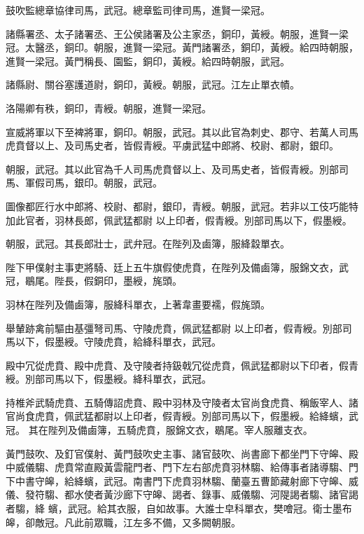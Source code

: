 \begin{pinyinscope}
 鼓吹監總章協律司馬，武冠。總章監司律司馬，進賢一梁冠。



 諸縣署丞、太子諸署丞、王公侯諸署及公主家丞，銅印，黃綬。朝服，進賢一梁冠。太醫丞，銅印。朝服，進賢一梁冠。黃門諸署丞，銅印，黃綬。給四時朝服，進賢一梁冠。黃門稱長、園監，銅印，黃綬。給四時朝服，武冠。



 諸縣尉、關谷塞護道尉，銅印，黃綬。朝服，武冠。江左止單衣幘。



 洛陽卿有秩，銅印，青綬。朝服，進賢一梁冠。



 宣威將軍以下至裨將軍，銅印。朝服，武冠。其以此官為刺史、郡守、若萬人司馬虎賁督以上、及司馬史者，皆假青綬。平虜武猛中郎將、校尉、都尉，銀印。



 朝服，武冠。其以此官為千人司馬虎賁督以上、及司馬史者，皆假青綬。別部司馬、軍假司馬，銀印。朝服，武冠。



 圖像都匠行水中郎將、校尉、都尉，銀印，青綬。朝服，武冠。若非以工伎巧能特加此官者，羽林長郎，佩武猛都尉
 以上印者，假青綬。別部司馬以下，假墨綬。



 朝服，武冠。其長郎壯士，武弁冠。在陛列及鹵簿，服絳縠單衣。



 陛下甲僕射主事吏將騎、廷上五牛旗假使虎賁，在陛列及備鹵簿，服錦文衣，武冠，鶡尾。陛長，假銅印，墨綬，旄頭。



 羽林在陛列及備鹵簿，服絳科單衣，上著韋畫要襦，假旄頭。



 舉輦跡禽前驅由基彊弩司馬、守陵虎賁，佩武猛都尉
 以上印者，假青綬。別部司馬以下，假墨綬。守陵虎賁，給絳科單衣，武冠。



 殿中冗從虎賁、殿中虎賁、及守陵者持鈒戟冗從虎賁，佩武猛都尉以下印者，假青綬。別部司馬以下，假墨綬。絳科單衣，武冠。



 持椎斧武騎虎賁、五騎傳詔虎賁、殿中羽林及守陵者太官尚食虎賁、稱飯宰人、諸官尚食虎賁，佩武猛都尉以上印者，假青綬。別部司馬以下，假墨綬。給絳蠙，武冠。
 其在陛列及備鹵簿，五騎虎賁，服錦文衣，鶡尾。宰人服離支衣。



 黃門鼓吹、及釘官僕射、黃門鼓吹史主事、諸官鼓吹、尚書廊下都坐門下守皞、殿中威儀騶、虎賁常直殿黃雲龍門者、門下左右部虎賁羽林騶、給傳事者諸導騶、門下中書守皞，給絳蠙，武冠。南書門下虎賁羽林騶、蘭臺五曹節藏射廊下守皞、威儀、發符騶、都水使者黃沙廊下守皞、謁者、錄事、威儀騶、河隄謁者騶、諸官謁者騶，絳
 蠙，武冠。給其衣服，自如故事。大誰士皁科單衣，樊噲冠。衛士墨布皞，卻敵冠。凡此前眾職，江左多不備，又多闕朝服。




\end{pinyinscope}
